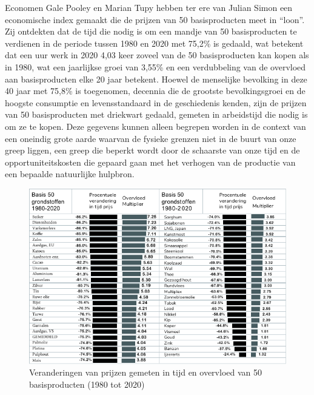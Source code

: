 Economen Gale Pooley en Marian Tupy hebben ter ere van Julian Simon een
economische index gemaakt die de prijzen van 50 basisproducten meet in
``loon''. Zij ontdekten dat de tijd die nodig is om een mandje van 50
basisproducten te verdienen in de periode tussen 1980 en 2020 met 75,2\%
is gedaald, wat betekent dat een uur werk in 2020 4,03 keer zoveel van
de 50 basisproducten kan kopen als in 1980, wat een jaarlijkse groei van
3,55\% en een verdubbeling van de overvloed aan basisproducten elke 20
jaar betekent.\autocite{33} Hoewel de menselijke bevolking in deze
40 jaar met 75,8\% is toegenomen, decennia die de grootste
bevolkingsgroei en de hoogste consumptie en levensstandaard in de
geschiedenis kenden, zijn de prijzen van 50 basisproducten met driekwart
gedaald, gemeten in arbeidstijd die nodig is om ze te kopen. Deze
gegevens kunnen alleen begrepen worden in de context van een oneindig
grote aarde waarvan de fysieke grenzen niet in de buurt van onze greep
liggen, een greep die beperkt wordt door de schaarste van onze tijd en
de opportuniteitskosten die gepaard gaan met het verhogen van de
productie van een bepaalde natuurlijke hulpbron.

\begin{figure}[!htb]
\centering
    \includegraphics[width=\textwidth]{figures/fig4.pdf}
\caption[Veranderingen van prijzen gemeten in tijd en
overvloed van 50 basisproducten (1980 tot 2020)]{Veranderingen van prijzen gemeten in tijd en overvloed van 50 basisproducten (1980 tot 2020)}
\label{fig4}
\end{figure}

